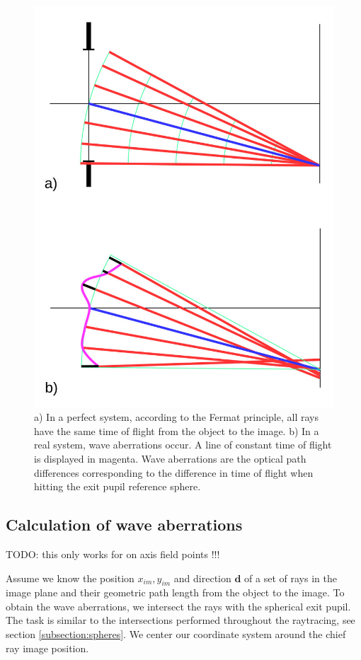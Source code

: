 \documentclass[12pt,a4paper,twoside,openright,BCOR10mm,headsepline,titlepage,abstracton,chapterprefix,final]{scrreprt}
\newcommand\Vector[1]{{\mathbf{#1}}}
\begin{document}
\begin{figure}
  \centering
   \includegraphics[width=0.5\columnwidth]{waveaberrations}
  \caption{a) In a perfect system, according to the Fermat principle, all rays have the same time of flight from the object to the image. b) In a real system, wave aberrations occur. A line of constant time of flight is displayed in magenta.
  Wave aberrations are the optical path differences corresponding to the difference in time of flight when hitting the exit pupil reference sphere.}
  \label{fig:waveaberrations}
\end{figure}

\subsection{Calculation of wave aberrations}
TODO: this only works for on axis field points !!!

Assume we know the position $x_{im}, y_{im}$ and direction $\Vector{d}$ of a set of rays in the image plane and their geometric path length from the object to the image.
To obtain the wave aberrations, we intersect the rays with the spherical exit pupil.
The task is similar to the intersections performed throughout the raytracing, see section \ref{subsection:spheres}.
We center our coordinate system around the chief ray image position.
\end{document}
